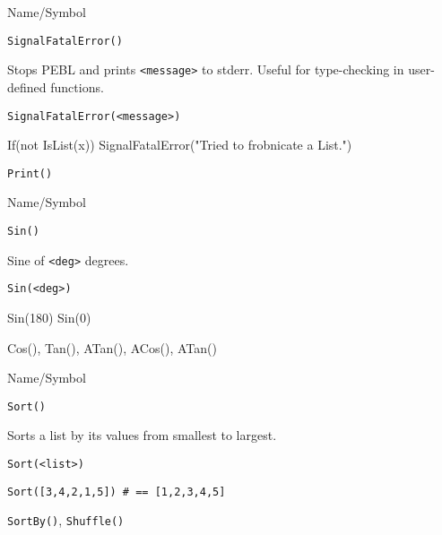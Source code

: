 \rl


\begin{desc}{Name/Symbol}
\item[Name/Symbol] 	\verb+SignalFatalError()+

\item[Description] Stops PEBL and prints \verb+<message>+ to stderr.
  Useful for type-checking in user-defined functions.

\item[Usage]
\begin{verbatim}
SignalFatalError(<message>)
\end{verbatim}
If(not IsList(x))
{
 SignalFatalError("Tried to frobnicate a List.")
}
\item[Example]

\item[See Also]     	\verb+Print()+
\end{desc}

\rl


\begin{desc}{Name/Symbol}
\item[Name/Symbol]  	\verb+Sin()+

\item[Description]  	Sine of \verb+<deg>+ degrees.

\item[Usage]        	
\begin{verbatim}
Sin(<deg>)
\end{verbatim}
Sin(180)
Sin(0)
\item[Example]

\item[See Also]    	Cos(), Tan(), ATan(), ACos(), ATan() 
\end{desc}

\rl


\begin{desc}{Name/Symbol}
\item[Name/Symbol] 	\verb+Sort()+

\item[Description] 	Sorts a list by its values from smallest to largest.

\item[Usage]       	
\begin{verbatim}
Sort(<list>)
\end{verbatim}

\item[Example]
\begin{verbatim}
Sort([3,4,2,1,5]) # == [1,2,3,4,5]
\end{verbatim}

\item[See Also]    	\verb+SortBy()+, \verb+Shuffle()+
\end{desc}


